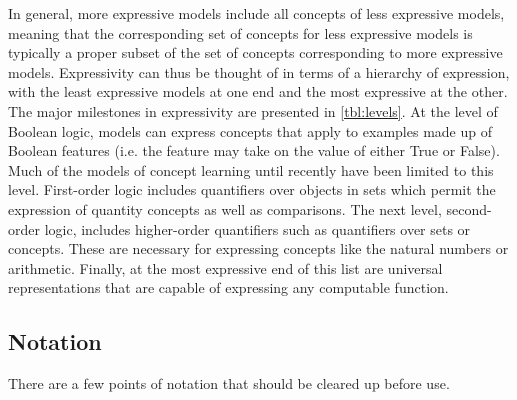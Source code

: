 \documentclass[doc,floatsintext]{apa6}
\begin{document}
In general, more expressive models include all concepts of less expressive models, meaning that the corresponding set of concepts for less expressive models is typically a proper subset of the set of concepts corresponding to more expressive models.
Expressivity can thus be thought of in terms of a hierarchy of expression, with the least expressive models at one end and the most expressive at the other.
The major milestones in expressivity are presented in \cref{tbl:levels}.
At the level of Boolean logic, models can express concepts that apply to examples made up of Boolean features (i.e. the feature may take on the value of either True or False).
Much of the models of concept learning until recently have been limited to this level.
First-order logic includes quantifiers over objects in sets which permit the expression of quantity concepts as well as comparisons.
The next level, second-order logic, includes higher-order quantifiers such as quantifiers over sets or concepts.
These are necessary for expressing concepts like the natural numbers or arithmetic.
Finally, at the most expressive end of this list are universal representations \citep{turing1937,abelsonss1996} that are capable of expressing any computable function.


\subsection{Notation}

There are a few points of notation that should be cleared up before use.
\end{document}
